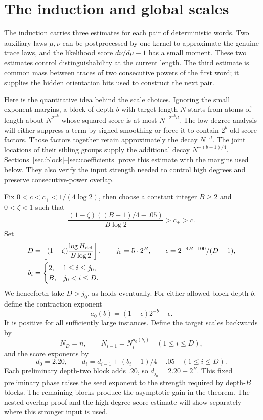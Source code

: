 \section{The induction and global scales}\label{sec:scales}

The induction carries three estimates for each pair of deterministic words.  Two auxiliary laws $\mu,\nu$ can be postprocessed by one kernel to approximate the genuine trace laws, and the likelihood score $d\nu/d\mu-1$ has a small moment.  These two estimates control distinguishability at the current length.  The third estimate is common mass between traces of two consecutive powers of the first word; it supplies the hidden orientation bits used to construct the next pair.

Here is the quantitative idea behind the scale choices.  Ignoring the small exponent margins, a block of depth $b$ with target length $N$ starts from atoms of length about $N^{2^{-b}}$ whose squared score is at most $N^{-2^{-b}d}$.  The low-degree analysis will either suppress a term by signed smoothing or force it to contain $2^b$ old-score factors.  Those factors together retain approximately the decay $N^{-d}$.  The joint locations of their sibling groups supply the additional decay $N^{-(b-1)/4}$.  Sections~\ref{sec:block}--\ref{sec:coefficients} prove this estimate with the margins used below.  They also verify the input strength needed to control high degrees and preserve consecutive-power overlap.

Fix $0<c<c_+<1/(4\log2)$, then choose a constant integer $B\ge2$ and $0<\zeta<1$ such that
\[
 \frac{(1-\zeta)((B-1)/4-.05)}{B\log2}>c_+>c.
\]
Set
\[
\begin{split}
 D &=\left\lfloor (1-\zeta)\frac{\log H_{\rm del}}{B\log 2}\right\rfloor,
 \qquad j_0=5\cdot 2^B,\qquad
 \epsilon=2^{-4B-100}/(D+1),\\
 b_i &=\begin{cases}2,&1\le i\le j_0,\\ B,&j_0<i\le D.\end{cases}
\end{split}
\]
We henceforth take $D>j_0$, as holds eventually.  For either allowed block depth $b$, define the contraction exponent
\begin{equation}\label{eq:contraction-exponent}
 a_0(b)=(1+\epsilon)2^{-b}-\epsilon.
\end{equation}
It is positive for all sufficiently large instances.  Define the target scales backwards by
\[
 N_D=n,\qquad N_{i-1}=N_i^{a_0(b_i)}\quad(1\le i\le D),
\]
and the score exponents by
\[
 d_0=2.20,\qquad
 d_i=d_{i-1}+(b_i-1)/4-.05\quad(1\le i\le D).
\]
Each preliminary depth-two block adds $.20$, so
$d_{j_0}=2.20+2^B$.  This fixed preliminary phase raises the seed exponent to the strength required by depth-$B$ blocks.  The remaining blocks produce the asymptotic gain in the theorem.  The nested-overlap proof and the high-degree score estimate will show separately where this stronger input is used.

